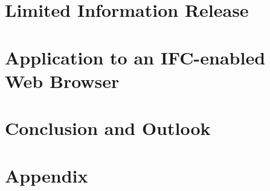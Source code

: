 \documentclass[a4paper,10pt,twoside,openright]{book}
\begin{document}
\part{Limited Information Release}
\cleardoublepage


\cleardoublepage
\part{Application to an IFC-enabled Web Browser}
\cleardoublepage
%





\cleardoublepage
\part{Conclusion and Outlook}
\cleardoublepage





\cleardoublepage
\appendix
\part*{Appendix}
\renewcommand{\thesection}{\Alph{section}}
\cleardoublepage




\cleardoublepage
\listoffigures
{}
 
\cleardoublepage
\listoftables
{}


\backmatter
\cleardoublepage


\end{document}
